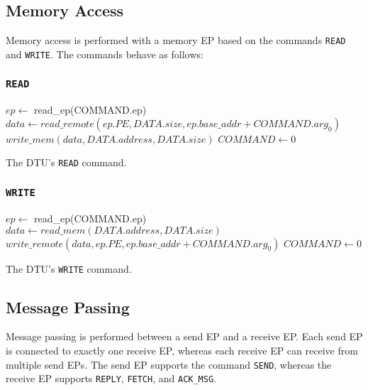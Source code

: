 \documentclass[a4paper,11pt,draft]{article}
\begin{document}
\subsection{Memory Access}

Memory access is performed with a memory EP based on the commands \texttt{READ} and \texttt{WRITE}. The commands behave as follows:

\subsubsection{\texttt{READ}}

\begin{algorithm}[H]
    $ep \gets$ read\_ep(COMMAND.ep)\;
    \BlankLine
    $data \gets read\_remote(ep.PE, DATA.size, ep.base\_addr + COMMAND.arg_0)$\;
    $write\_mem(data, DATA.address, DATA.size)$\;
    \BlankLine
    $COMMAND \gets 0$\;
    \caption{The DTU's \texttt{READ} command.}
\end{algorithm}

\subsubsection{\texttt{WRITE}}

\begin{algorithm}[H]
    $ep \gets$ read\_ep(COMMAND.ep)\;
    \BlankLine
    $data \gets read\_mem(DATA.address, DATA.size)$\;
    $write\_remote(data, ep.PE, ep.base\_addr + COMMAND.arg_0)$\;
    \BlankLine
    $COMMAND \gets 0$\;
    \caption{The DTU's \texttt{WRITE} command.}
\end{algorithm}

\subsection{Message Passing}

Message passing is performed between a send EP and a receive EP. Each send EP is connected to
exactly one receive EP, whereas each receive EP can receive from multiple send EPs. The send EP
supports the command \texttt{SEND}, whereas the receive EP supports \texttt{REPLY}, \texttt{FETCH},
and \texttt{ACK\_MSG}.
\end{document}
